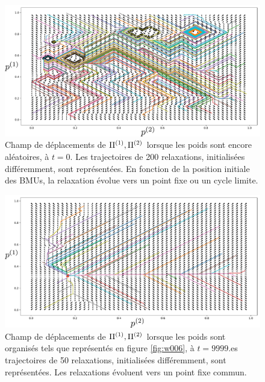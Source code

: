 \documentclass[../main]{subfiles}
\begin{document}
\begin{figure}
\centering
\includegraphics[width=\textwidth]{champ_006_t1.pdf}
\caption{Champ de déplacements de $\Pi^{({1})},\Pi^{({2})}$ lorsque les poids sont encore aléatoires, à $t=0$. Les trajectoires de 200 relaxations, initialisées différemment, sont représentées. En fonction de la position initiale des BMUs, la relaxation évolue vers un point fixe ou un cycle limite. }
\label{fig:champ_0}
\end{figure}


\begin{figure}
\centering
\includegraphics[width=\textwidth]{champ_006.pdf}
\caption{Champ de déplacements de $\Pi^{({1})},\Pi^{({2})}$ lorsque les poids sont organisés tels que représentés en figure \ref{fig:w006}, à $t=9999$.es trajectoires de 50  relaxations, initialisées différemment, sont représentées. Les relaxations évoluent vers un point fixe commun.}
\label{fig:champ_9999}
\end{figure}
\end{document}

